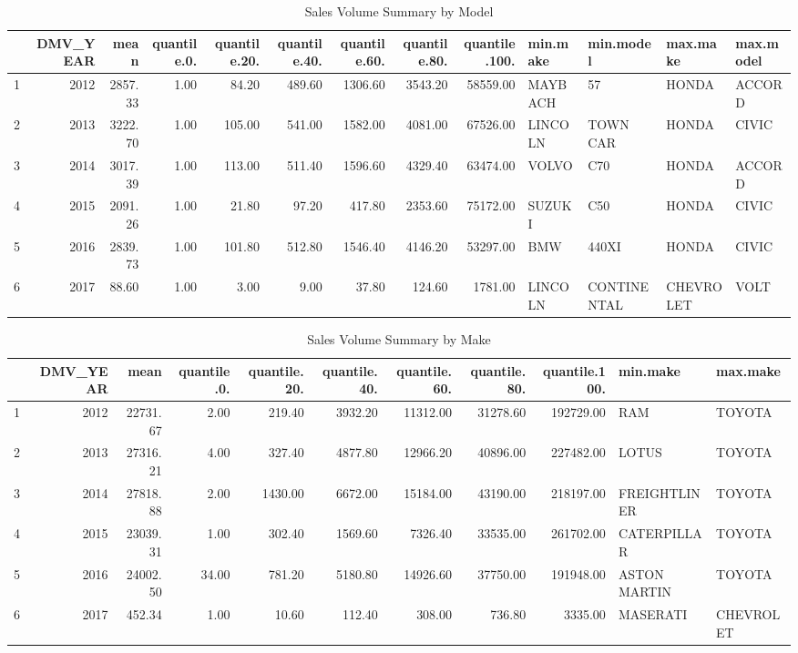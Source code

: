 \documentclass{article}
\begin{document}
\begin{table}[h]
\centering
\caption{Sales Volume Summary by Model}
\begin{tabular}{rrrrrrrrrllll}
  \hline
 & DMV\_YEAR & mean & quantile.0. & quantile.20. & quantile.40. & quantile.60. & quantile.80. & quantile.100. & min.make & min.model & max.make & max.model \\ 
  \hline
1 & 2012 & 2857.33 & 1.00 & 84.20 & 489.60 & 1306.60 & 3543.20 & 58559.00 & MAYBACH & 57 & HONDA & ACCORD \\ 
  2 & 2013 & 3222.70 & 1.00 & 105.00 & 541.00 & 1582.00 & 4081.00 & 67526.00 & LINCOLN & TOWN CAR & HONDA & CIVIC \\ 
  3 & 2014 & 3017.39 & 1.00 & 113.00 & 511.40 & 1596.60 & 4329.40 & 63474.00 & VOLVO & C70 & HONDA & ACCORD \\ 
  4 & 2015 & 2091.26 & 1.00 & 21.80 & 97.20 & 417.80 & 2353.60 & 75172.00 & SUZUKI & C50 & HONDA & CIVIC \\ 
  5 & 2016 & 2839.73 & 1.00 & 101.80 & 512.80 & 1546.40 & 4146.20 & 53297.00 & BMW & 440XI & HONDA & CIVIC \\ 
  6 & 2017 & 88.60 & 1.00 & 3.00 & 9.00 & 37.80 & 124.60 & 1781.00 & LINCOLN & CONTINENTAL & CHEVROLET & VOLT \\ 
   \hline
\end{tabular}
\end{table}


\begin{table}[ht]
\centering
\caption{Sales Volume Summary by Make}
\begin{tabular}{rrrrrrrrrll}
  \hline
 & DMV\_YEAR & mean & quantile.0. & quantile.20. & quantile.40. & quantile.60. & quantile.80. & quantile.100. & min.make & max.make \\ 
  \hline
1 & 2012 & 22731.67 & 2.00 & 219.40 & 3932.20 & 11312.00 & 31278.60 & 192729.00 & RAM & TOYOTA \\ 
  2 & 2013 & 27316.21 & 4.00 & 327.40 & 4877.80 & 12966.20 & 40896.00 & 227482.00 & LOTUS & TOYOTA \\ 
  3 & 2014 & 27818.88 & 2.00 & 1430.00 & 6672.00 & 15184.00 & 43190.00 & 218197.00 & FREIGHTLINER & TOYOTA \\ 
  4 & 2015 & 23039.31 & 1.00 & 302.40 & 1569.60 & 7326.40 & 33535.00 & 261702.00 & CATERPILLAR & TOYOTA \\ 
  5 & 2016 & 24002.50 & 34.00 & 781.20 & 5180.80 & 14926.60 & 37750.00 & 191948.00 & ASTON MARTIN & TOYOTA \\ 
  6 & 2017 & 452.34 & 1.00 & 10.60 & 112.40 & 308.00 & 736.80 & 3335.00 & MASERATI & CHEVROLET \\ 
   \hline
\end{tabular}
\end{table}
\end{document}
